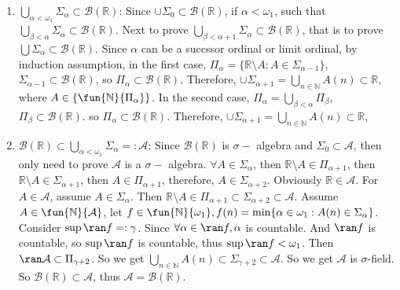 \documentclass{ctexart}
\begin{document}
\begin{solution}
  \begin{enumerate}
    \item \(\bigcup_{\alpha < \omega_1} \Sigma_{\alpha} \subset \mathcal{B}(\mathbb{R})\):
      Since \(\cup\Sigma_0 \subset \mathcal{B}(\mathbb{R})\), if \(\alpha < \omega_1\), such that \(\bigcup_{\beta <\alpha}\Sigma_{\alpha} \subset \mathcal{B}(\mathbb{R})\).
      Next to prove \(\bigcup_{\beta < \alpha + 1} \Sigma_{\alpha} \subset \mathcal{B}(\mathbb{R})\), 
      that is to prove \(\bigcup \Sigma_{\alpha} \subset \mathcal{B}(\mathbb{R})\).
      Since \(\alpha\) can be a succssor ordinal or limit ordinal, 
      by induction assumption, 
      in the first case, \(\Pi_{\alpha} = \{\mathbb{R} \setminus A : A \in \Sigma_{\alpha - 1 }\}\), 
      \(\Sigma_{\alpha -1} \subset \mathcal{B}(\mathbb{R}) \), so \(\Pi_{\alpha} \subset \mathcal{B}(\mathbb{R})\).
      Therefore, \(\cup \Sigma_{\alpha+1} = \bigcup_{n \in \mathbb{N}} A(n) \subset \mathbb{R}\), 
      where \(A \in \{\fun{\mathbb{N}}{\Pi_{\alpha}}\}\). 
      In the second case, \(\Pi_{\alpha } = \bigcup_{\beta < \alpha} \Pi_{\beta}\), \(\Pi_{\beta} \subset \mathcal{B}(\mathbb{R})\).
      so \(\Pi_{\alpha} \subset \mathcal{B}(\mathbb{R})\). 
      Therefore, \(\cup \Sigma_{\alpha+1} = \bigcup_{n \in \mathbb{N}} A(n) \subset \mathbb{R}\), 
    \item \(\mathcal{B}(\mathbb{R}) \subset \bigcup_{\alpha < \omega_1} \Sigma_{\alpha} =: \mathcal{A}\):
      Since \(\mathcal{B}(\mathbb{R})\) is \(\sigma-\) algebra and \(\Sigma_0 \subset \mathcal{A}\), then only 
      need to prove \(\mathcal{A}\) is a \(\sigma-\) algebra.
      \(\forall A \in\Sigma_{\alpha}\), then \(\mathbb{R} \setminus A \in \Pi_{\alpha+1}\),
      then \(\mathbb{R} \setminus A \in \Sigma_{\alpha + 1}\), then \(A \in \Pi_{\alpha+1}\), 
      therefore, \(A \in \Sigma_{\alpha+2}\). 
      Obviously \(\mathbb{R} \in \mathcal{A}\). For \(A \in \mathcal{A}\), assume \(A \in \Sigma_{\alpha}\). 
      Then \(\mathbb{R}\setminus A \in \Pi_{\alpha+1} \subset \Sigma_{\alpha + 2 }\subset \mathcal{A}\). 
      Assume \(A \in \fun{\mathbb{N}}{\mathcal{A}}\), let \(f \in \fun{\mathbb{N}}{\omega_1},f(n)=\min\{\alpha \in \omega_1:A(n) \in \Sigma_{\alpha}\}\). 
      Consider \(\sup \ran f =:\gamma\). Since \(\forall \alpha \in \ran f,\alpha\) is countable. And \(\ran f\) is countable, 
      so \(\sup \ran f\) is countable, thus \(\sup \ran f <\omega_1\). 
      Then \(\ran \mathcal{A} \subset \Pi_{\gamma+2} \). So we get \(\bigcup_{n \in \mathbb{N}} A(n) \subset \Sigma_{\gamma+2} \subset \mathcal{A}\). 
      So we get \(\mathcal{A} \) is \(\sigma\)-field. So \(\mathcal{B}(\mathbb{R}) \subset \mathcal{A}\), thus \(\mathcal{A}=\mathcal{B}(\mathbb{R})\). 

  \end{enumerate}
\end{solution}
\end{document}
